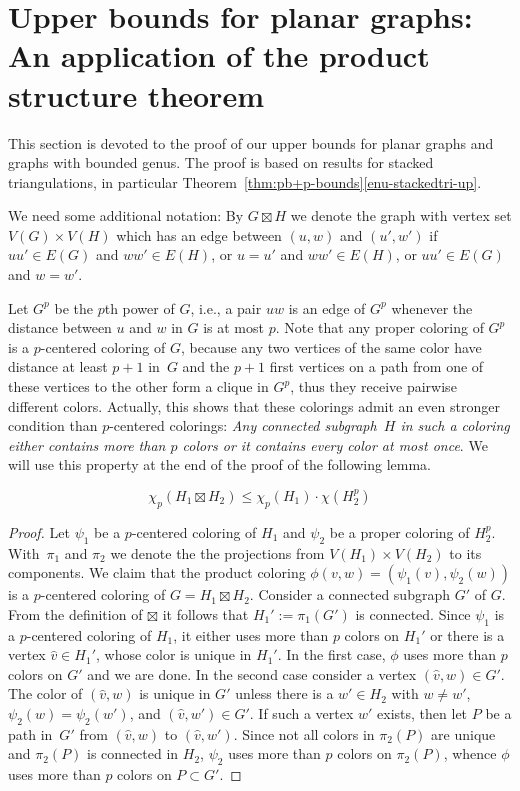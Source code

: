 \section{Upper bounds for planar graphs: An application of the product
structure theorem}
\label{sec-product-structure}\label{sec-application-of-the-structure-thm}

This section is devoted to the proof of our upper bounds for planar graphs and
graphs with bounded genus. The proof is based on results for stacked
triangulations, in particular Theorem~\ref{thm:pb+p-bounds}\ref{enu-stackedtri-up}.

We need some additional notation: By $G\boxtimes H$ we denote the graph with
vertex set $V(G)\times V(H)$ which has an edge between $(u,w)$ and $(u',w')$
if $uu'\in E(G)$ and $ww'\in E(H)$, or $u=u'$ and $ww'\in E(H)$, or $uu'\in E(G)$ and $w=w'$.

Let $G^p$ be the $p$th power of $G$, i.e., a pair $uw$ is an edge of $G^p$ whenever the distance
between $u$ and $w$ in $G$ is at most $p$. Note that any proper coloring of $G^p$  is a $p$-centered 
coloring of $G$, because any two vertices of the same color have distance at least $p+1$ in~$G$
and the $p+1$ first vertices on a path from one of these vertices to the other form a clique in
$G^p$, thus they receive pairwise different colors. Actually, this shows that these colorings admit an
even stronger condition than $p$-centered colorings: \emph{Any connected subgraph~$H$ in such a
coloring either contains more than $p$ colors or it contains every color at most once}.
We will use this property at the end of the proof of the following lemma.

\begin{lemma}
$$\chi_p(H_1\boxtimes H_2)\leq \chi_p(H_1)\cdot \chi(H_2^p) $$
\end{lemma}
\begin{proof}
  Let $\psi_1$ be a $p$-centered coloring of $H_1$ and $\psi_2$ be a proper
  coloring of $H_2^p$.  With~$\pi_1$ and $\pi_2$ we denote the the projections
  from $V(H_1)\times V(H_2)$ to its components.  We claim that the product
  coloring $\phi(v,w)=(\psi_1(v),\psi_2(w))$ is a $p$-centered coloring of
  $G=H_1 \boxtimes H_2$. Consider a connected subgraph $G'$ of $G$.  From the
  definition of $\boxtimes$ it follows that $H_1':=\pi_1(G')$ is
  connected. Since $\psi_1$ is a $p$-centered coloring of $H_1$, it either uses more
  than $p$ colors on $H_1'$ or there is a vertex $\hat{v}\in H_1'$, whose
  color is unique in $H_1'$. In the first case, $\phi$ uses more than $p$
  colors on $G'$ and we are done. In the second case consider a vertex
  $(\hat{v},w)\in G'$. The color of $(\hat{v},w)$ is unique in $G'$ unless
  there is a $w'\in H_2$ with $w\neq w'$, $\psi_2(w)=\psi_2(w')$, and $(\hat{v},w')\in G'$.
  If such a vertex $w'$ exists, then let $P$ be a path in~$G'$ from $(\hat{v},w)$ to
  $(\hat{v},w')$. Since not all colors in $\pi_2(P)$ are unique and $\pi_2(P)$ is connected in $H_2$, 
  $\psi_2$ uses more
  than $p$ colors on $\pi_2(P)$, whence $\phi$ uses more than $p$ colors on
  $P\subset G'$.
\end{proof}

